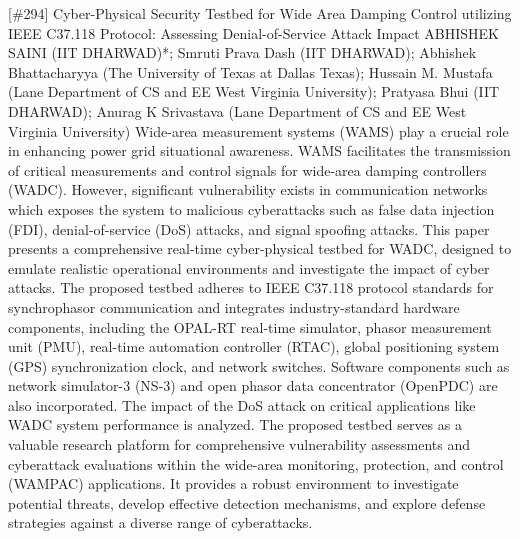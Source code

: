 {} \begin{abstract_online} {[\#294] Cyber-Physical Security Testbed for Wide Area Damping Control utilizing IEEE C37.118 Protocol: Assessing Denial-of-Service Attack Impact} {} {ABHISHEK SAINI (IIT DHARWAD)*; Smruti Prava  Dash (IIT DHARWAD); Abhishek  Bhattacharyya (The University of Texas at Dallas Texas); Hussain  M. Mustafa (Lane Department of CS and EE West Virginia University); Pratyasa  Bhui (IIT DHARWAD); Anurag  K Srivastava (Lane Department of CS and EE West Virginia University)} {} Wide-area measurement systems (WAMS) play a crucial role in enhancing power grid situational awareness. WAMS facilitates the transmission of critical measurements and control signals for wide-area damping controllers (WADC). However, significant vulnerability exists in communication networks which exposes the system to malicious cyberattacks such as false data injection (FDI), denial-of-service (DoS) attacks, and signal spoofing attacks. This paper presents a comprehensive real-time cyber-physical testbed for WADC, designed to emulate realistic operational environments and investigate the impact of cyber attacks. The proposed testbed adheres to IEEE C37.118 protocol standards for synchrophasor communication and integrates industry-standard hardware components, including the OPAL-RT real-time simulator, phasor measurement unit (PMU), real-time automation controller (RTAC), global positioning system (GPS) synchronization clock, and network switches. Software components such as network simulator-3 (NS-3) and open phasor data concentrator (OpenPDC) are also incorporated. The impact of the DoS attack on critical applications like WADC system performance is analyzed. The proposed testbed serves as a valuable research platform for comprehensive vulnerability assessments and cyberattack evaluations within the wide-area monitoring, protection, and control (WAMPAC) applications. It provides a robust environment to investigate potential threats, develop effective detection mechanisms, and explore defense strategies against a diverse range of cyberattacks. \end{abstract_online} 
